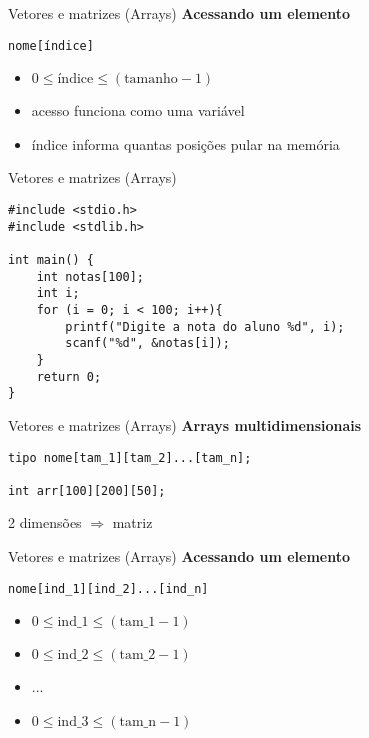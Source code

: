\documentclass[10pt]{beamer}
\begin{document}
\begin{frame}[fragile]{Vetores e matrizes (Arrays)}
    \huge
    \textbf{Acessando um elemento}
    
    \bigskip
    
    \begin{verbatim}
nome[índice]
    \end{verbatim}
    
    \Large
    \setlength{\leftmargini}{0pt}
    \begin{itemize}
        \item [] $0 \leq \text{índice} \leq (\text{tamanho} - 1)$ \faExclamationTriangle
        \item [] acesso funciona como uma variável
        \item [] índice informa quantas posições pular na memória
    \end{itemize}
\end{frame}

\begin{frame}[fragile]{Vetores e matrizes (Arrays)}
    \begin{verbatim}
#include <stdio.h>
#include <stdlib.h>

int main() {
    int notas[100];
    int i;
    for (i = 0; i < 100; i++){
        printf("Digite a nota do aluno %d", i);
        scanf("%d", &notas[i]);
    }
    return 0;
}
    \end{verbatim}
\end{frame}

\begin{frame}[fragile]{Vetores e matrizes (Arrays)}
    \huge
    \textbf{Arrays multidimensionais}
    
    \bigskip
    
    \Large
    \begin{verbatim}
tipo nome[tam_1][tam_2]...[tam_n];

int arr[100][200][50];
    \end{verbatim}
    
    
    2 dimensões $\Longrightarrow$ matriz
\end{frame}

\begin{frame}[fragile]{Vetores e matrizes (Arrays)}
    \huge
    \textbf{Acessando um elemento}
    
    \bigskip
    
    \Large
    \begin{verbatim}
nome[ind_1][ind_2]...[ind_n]
    \end{verbatim}
    
    \setlength{\leftmargini}{0pt}
    \begin{itemize}
        \item [] $0 \leq \text{ind\_1} \leq (\text{tam\_1} - 1)$
        \item [] $0 \leq \text{ind\_2} \leq (\text{tam\_2} - 1)$
        \item [] ...
        \item [] $0 \leq \text{ind\_3} \leq (\text{tam\_n} - 1)$
    \end{itemize}
\end{frame}
\end{document}
